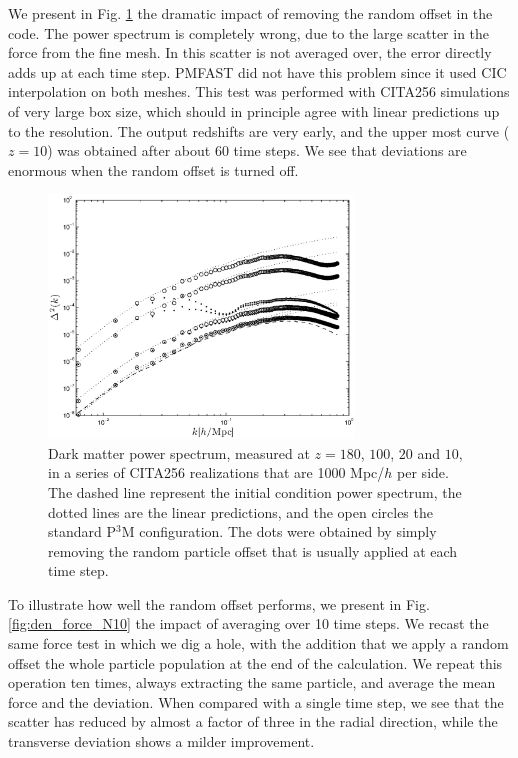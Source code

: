 We present in Fig. \ref{fig:disp_mesh} the dramatic impact of removing the random offset in the code.
The power spectrum is completely wrong, due to the large scatter in the force from the fine mesh.
In this scatter is not averaged over, the error directly adds up at each time step. {\small PMFAST}
did not have this problem since it used CIC interpolation on both meshes.  
This test was performed with CITA256 simulations of very large box size,
which should in principle agree with linear predictions up to the resolution.
The output redshifts are very early, and the upper most curve ($z=10$) was obtained after
about 60 time steps.
We see that deviations are enormous when the random offset is turned off.

\begin{figure}%
  \begin{center}
    \includegraphics[width=3.2in]{graphs/power_w_wo_disp_mesh.eps}
  \caption{Dark matter power spectrum, measured at $z=180$, $100$, $20$ and $10$, in a series of CITA256 realizations that are 1000 Mpc/$h$ per side. The dashed line represent the initial condition power spectrum, the dotted lines are the linear predictions, and  the open circles the standard P$^3$M configuration. 
  The dots were obtained by simply removing the random particle offset that is usually applied at each time step. \label{fig:disp_mesh}}
\end{center}
\end{figure}

To illustrate how well the random offset performs, we present in Fig. \ref{fig:den_force_N10}
the impact of averaging over 10 time steps. We recast the same force test in which we dig a hole, 
with the addition that we apply a random offset the whole particle population at the end of the calculation.
We repeat this operation ten times, always extracting the same particle, and average the mean force and the deviation.
When compared with a single time step, we see that the scatter has reduced by almost a factor of three in the radial direction, 
while the transverse deviation shows a milder improvement.

